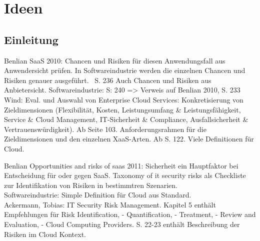 \section{Ideen}
\subsection{Einleitung}
Benlian SaaS 2010: Chancen und Risiken für diesen Anwendungsfall aus Anwendersicht prüfen. In Softwareindustrie werden die einzelnen Chancen und Risiken genauer ausgeführt. ~S. 236
Auch Chancen und Risiken aus Anbietersicht. Softwareindustrie: S: 240 => Verweis auf Benlian 2010, S. 233 \\
Wind: Eval. und Auswahl von Enterprise Cloud Services: Konkretisierung von Zieldimensionen (Flexibilität, Kosten, Leistungsumfang  \& Leistungsfähigkeit, Service \& Cloud Management, IT-Sicherheit \&
Compliance, Ausfallsicherheit \& Vertrauenswürdigkeit). Ab Seite 103. Anforderungsrahmen für die Zieldimensionen und den einzelnen XaaS-Arten. Ab S. 122. Viele Definitionen für Cloud.

Benlian Opportunities and risks of saas 2011: Sicherheit ein Hauptfaktor bei Entscheidung für oder gegen SaaS. Taxonomy of it security risks als Checkliste zur Identifikation von Risiken in bestimmtren 
Szenarien. \\

Softwareindustrie: Simple Definition für Cloud aus Standard. \\

Ackermann, Tobias: IT Security Risk Management. Kapitel 5 enthält Empfehlungen für Risk Identification, - Quantification, - Treatment, - Review and Evaluation, - Cloud Computing Providers. S. 22-23 enthält
Beschreibung der Risiken im Cloud Kontext.